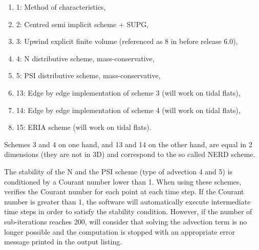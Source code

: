 \begin{enumerate}
\item[\nonumber]  1: Method of characteristics,

\item [\nonumber]  2: Centred semi implicit scheme + SUPG,

\item[\nonumber]   3:  Upwind explicit finite volume (referenced as 8 in before release 6.0),

\item [\nonumber]  4: N distributive scheme, mass-conservative,

\item [\nonumber]  5:  PSI distributive scheme, mass-conservative,
%

\item [\nonumber]  13: Edge by edge implementation of scheme 3 (will work on tidal flats),

\item [\nonumber]  14: Edge by edge implementation of scheme 4 (will work on tidal flats),

\item [\nonumber] 15: ERIA scheme (will work on tidal flats).
\end{enumerate}

 Schemes 3 and 4 on one hand, and 13 and 14 on the other hand, are equal in 2 dimensions (they are not in 3D) and correspond to the so called NERD scheme.

 The stability of the N and the PSI scheme (type of advection 4 and 5) is conditioned by a Courant number lower than 1. When using these schemes,  verifies the Courant number for each point at each time step. If the Courant number is greater than 1, the software will automatically execute intermediate time steps in order to satisfy the stability condition. However, if the number of sub-iterations reaches 200,  will consider that solving the advection term is no longer possible and the computation is stopped with an appropriate error message printed in the output listing.

